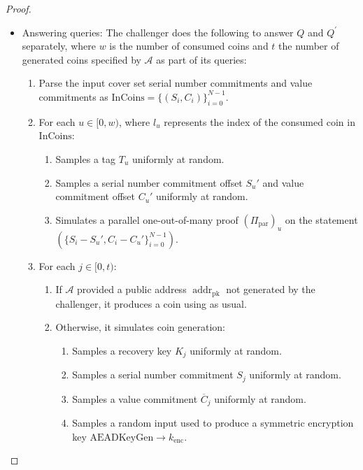 \documentclass{llncs}
\newcommand{\addr}{\operatorname{addr}}
\newcommand{\com}{\operatorname{Com}}
\begin{document}
\begin{proof}
\begin{itemize}
\begin{enumerate}
\begin{enumerate}
        \end{enumerate}
        \item Simulates the balance proof $\Pi_{\text{bal}}$ on the statement $(C - \com(v,0)$.
        \item Assembles the transaction and adds it to the ledger as appropriate.
    \end{enumerate}
    \item Answering  queries: The challenger does the following to answer $Q$ and $Q^\prime$ separately, where $w$ is the number of consumed coins and $t$ the number of generated coins specified by $\mathcal{A}$ as part of its queries:
    \begin{enumerate}
        \item Parse the input cover set serial number commitments and value commitments as $\text{InCoins} = \{(S_i, C_i)\}_{i=0}^{N-1}$.
        \item For each $u \in [0,w)$, where $l_u$ represents the index of the consumed coin in $\text{InCoins}$:
        \begin{enumerate}
            \item Samples a tag $T_u$ uniformly at random.
            \item Samples a serial number commitment offset $S_u'$ and value commitment offset $C_u'$ uniformly at random.
            \item Simulates a parallel one-out-of-many proof $(\Pi_{\text{par}})_u$ on the statement $(\{S_i - S_u', C_i - C_u'\}_{i=0}^{N-1})$.
        \end{enumerate}
        \item For each $j \in [0,t)$:
        \begin{enumerate}
            \item If $\mathcal{A}$ provided a public address $\addr_{\text{pk}}$ not generated by the challenger, it produces a coin using  as usual.
            \item Otherwise, it simulates coin generation:
            \begin{enumerate}
                \item Samples a recovery key $K_j$ uniformly at random.
                \item Samples a serial number commitment $S_j$ uniformly at random.
                \item Samples a value commitment $\overline{C}_j$ uniformly at random.
                \item Samples a random input used to produce a symmetric encryption key $\text{AEADKeyGen} \to k_{\text{enc}}$.

\end{enumerate}
\end{enumerate}
\end{enumerate}
\end{itemize}
\end{proof}
\end{document}

